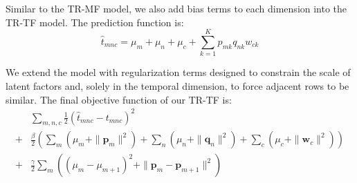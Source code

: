 %
Similar to the TR-MF model, we also add bias terms to each dimension into the TR-TF model. The prediction function is:
\vspace{-0.2cm}
{
\scriptsize
\begin{equation*}
\hat{t}_{mnc}=\mu_m+\mu_n+\mu_c+\sum\limits_{k=1}^{K}{p_{mk} q_{nk} w_{ck}}
\end{equation*}
}
\vspace{-0.4cm}

%
We extend the model with regularization terms designed to constrain the scale of latent factors
and, solely in the temporal dimension, to force adjacent rows to be similar.
The final objective function of our TR-TF is:\\
{
\scriptsize
\begin{equation*}
\begin{aligned}
& \sum\limits_{m, n, c} \frac{1}{2}(\hat{t}_{mnc}- t_{mnc})^2 \\
+ & \frac{\beta}{2}\left(\sum_m(\mu_m + \|\mathbf{p}_m\|^2) + \sum_n(\mu_n + \|\mathbf{q}_n\|^2) + \sum_c(\mu_c + \|\mathbf{w}_c\|^2)\right) \\
+ & \frac{\gamma}{2}\sum_m \left( (\mu_m-\mu_{m+1})^2 + \|\mathbf{p}_m-\mathbf{p}_{m+1}\|^2\right) \\
\end{aligned}
\end{equation*}
}

